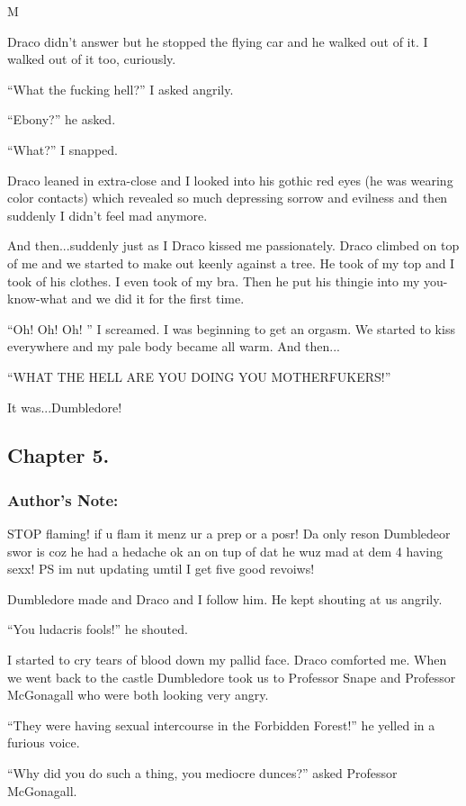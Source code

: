 M\documentclass{article}
\begin{document}
Draco didn’t answer but he stopped the flying car and he walked out of it. I walked out of it too, curiously.

“What the fucking hell?” I asked angrily.

“Ebony?” he asked.

“What?” I snapped.

Draco leaned in extra-close and I looked into his gothic red eyes (he was wearing color contacts) which revealed so much depressing sorrow and evilness and then suddenly I didn’t feel mad anymore.

And then...suddenly just as I Draco kissed me passionately. Draco climbed on top of me and we started to make out keenly against a tree. He took of my top and I took of his clothes. I even took of my bra. Then he put his thingie into my you-know-what and we did it for the first time.

“Oh! Oh! Oh! ” I screamed. I was beginning to get an orgasm. We started to kiss everywhere and my pale body became all warm. And then...

“WHAT THE HELL ARE YOU DOING YOU MOTHERFUKERS!”

It was...Dumbledore!

\clearpage\nolinenumbers
\subsection*{Chapter 5.}

\subsubsection*{Author's Note: }STOP flaming! if u flam it menz ur a prep or a posr! Da only reson Dumbledeor swor is coz he had a hedache ok an on tup of dat he wuz mad at dem 4 having sexx! PS im nut updating umtil I get five good revoiws!

\textbreak
\linenumbers\resetlinenumber

Dumbledore made and Draco and I follow him. He kept shouting at us angrily.

“You ludacris fools!” he shouted.

I started to cry tears of blood down my pallid face. Draco comforted me. When we went back to the castle Dumbledore took us to Professor Snape and Professor McGonagall who were both looking very angry.

“They were having sexual intercourse in the Forbidden Forest!” he yelled in a furious voice.

“Why did you do such a thing, you mediocre dunces?” asked Professor McGonagall.
\end{document}
